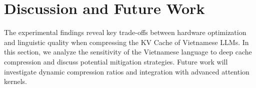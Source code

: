 \section{Discussion and Future Work}
\label{sec:discussion}

The experimental findings reveal key trade-offs between hardware optimization and linguistic quality when compressing the KV Cache of Vietnamese LLMs. In this section, we analyze the sensitivity of the Vietnamese language to deep cache compression and discuss potential mitigation strategies. Future work will investigate dynamic compression ratios and integration with advanced attention kernels.

